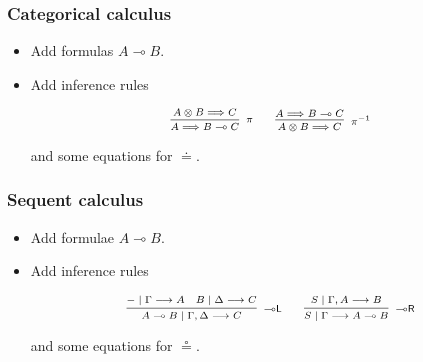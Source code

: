 \documentclass[10pt,t]{beamer}
\newcommand{\ot}{\otimes}
\newcommand{\tto}{\Longrightarrow}
\newcommand{\loL}{{\lo}\mathsf{L}}
\newcommand{\loR}{{\lo}\mathsf{R}}
\renewcommand{\vdash}{\longrightarrow}
\newcommand{\lo}{\multimap}
\newcommand{\lolli}{\lo}
\begin{document}
\begin{frame}

\frametitle{Categorical calculus}

\begin{itemize}

\item Add formulas $A \lolli B$.

\bigskip

\item Add inference rules 

\[
\scriptsize
\infer[\pi]{A \tto B \lolli C}{
  A \ot B \tto C
}
\qquad
\infer[\pi^{-1}]{A \ot B \tto C}{
  A \tto B \lolli C
}
\]

and some equations for $\doteq$.

\end{itemize}

\end{frame}


\begin{frame}

\frametitle{Sequent calculus}

\begin{itemize}

\item Add formulae $A \lolli B$.

\bigskip

\item Add inference rules 

\[
\scriptsize
    \infer[\loL]{A \lolli B \mid \Gamma , \Delta \vdash C}{
      {-} \mid \Gamma \vdash A
      &
      B \mid \Delta \vdash C
    }
    \qquad
    \infer[\loR]{S \mid \Gamma \vdash A \lolli B}{S \mid \Gamma , A \vdash B}
\]

and some equations for $\circeq$.

\end{itemize}

\end{frame}
\end{document}
